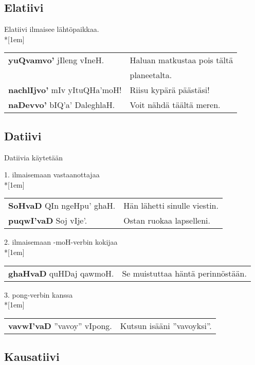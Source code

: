 \documentclass{book}
\begin{document}
\subsection{Elatiivi}

Elatiivi ilmaisee lähtöpaikkaa.\\*[1em]
\begin{tabular}{l l}
    \textbf{yuQvamvo'} jIleng vIneH. & Haluan matkustaa pois tältä \\
    & planeetalta. \\
    \textbf{nachlIjvo'} mIv yItuQHa'moH! & Riisu kypärä päästäsi! \\
    \textbf{naDevvo'} bIQ'a' DaleghlaH. & Voit nähdä täältä meren. \\
\end{tabular}

\subsection{Datiivi}

Datiivia käytetään

1. ilmaisemaan vastaanottajaa\\*[1em]
\begin{tabular}{l l}
    \textbf{SoHvaD} QIn ngeHpu' ghaH. & Hän lähetti sinulle viestin. \\
    \textbf{puqwI'vaD} Soj vIje'. & Ostan ruokaa lapselleni. \\
\end{tabular}

2. ilmaisemaan -moH-verbin kokijaa
\\*[1em]
\begin{tabular}{l l}
    \textbf{ghaHvaD} quHDaj qawmoH. & Se muistuttaa häntä perinnöstään. \\
\end{tabular}

3. pong-verbin kanssa\\*[1em]
\begin{tabular}{l l}
    \textbf{vavwI'vaD} ''vavoy'' vIpong. & Kutsun isääni ''vavoyksi''. \\
\end{tabular}

\subsection{Kausatiivi}
\end{document}
